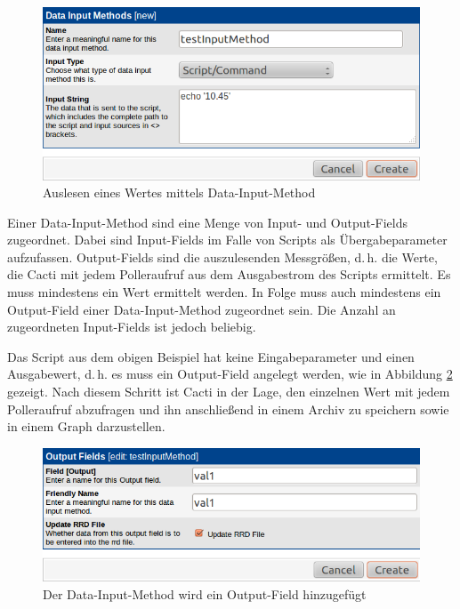 \documentclass[12pt,ngerman,toc=listofnumbered,toc=bibliographynumbered,toc=index,headsepline=true]{scrbook}
\begin{document}
\begin{figure}
	\centering
	\includegraphics[scale=0.5]{bilder/echoinputmethod}
	\caption{Auslesen eines Wertes mittels Data-Input-Method}
	\label{fig:echoinputmethod}
\end{figure}

Einer Data-Input-Method sind eine Menge von Input- und Output-Fields zugeordnet.
Dabei sind Input-Fields im Falle von Scripts als Übergabeparameter
aufzufassen. Output-Fields sind die auszulesenden Messgrößen, d.\,h. die Werte,
die Cacti mit jedem Polleraufruf aus dem Ausgabestrom des Scripts ermittelt. Es
muss mindestens ein Wert ermittelt werden. In Folge muss auch mindestens ein
Output-Field einer Data-Input-Method zugeordnet sein. Die Anzahl an zugeordneten
Input-Fields ist jedoch beliebig.

Das Script aus dem obigen Beispiel hat keine Eingabeparameter und einen
Ausgabewert, d.\,h. es muss ein Output-Field angelegt werden, wie in Abbildung
\ref{fig:echooutputfield} gezeigt. Nach diesem Schritt ist Cacti in der Lage,
den einzelnen Wert mit jedem Polleraufruf abzufragen und ihn anschließend in
einem Archiv zu speichern sowie in einem Graph darzustellen.

\begin{figure}
	\centering
	\includegraphics[scale=0.5]{bilder/echooutputfield}
	\caption{Der Data-Input-Method wird ein Output-Field hinzugefügt}
	\label{fig:echooutputfield}
\end{figure}
\end{document}
